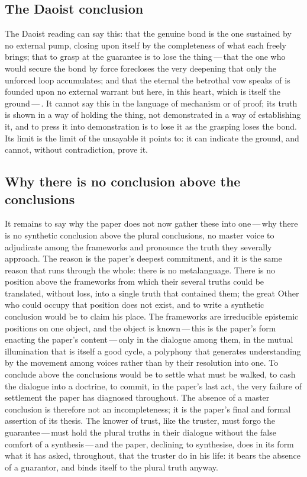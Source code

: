 \subsection*{The Daoist conclusion}
\label{p13:sub:concl-dao}

The Daoist reading can say this: that the genuine bond is the one sustained by no external pump, closing upon itself by the completeness of what each freely brings; that to grasp at the guarantee is to lose the thing\,---\,that the one who would secure the bond by force forecloses the very deepening that only the unforced loop accumulates; and that the eternal the betrothal vow speaks of is founded upon no external warrant but here, in this heart, which is itself the ground\,---\,. It cannot say this in the language of mechanism or of proof; its truth is shown in a way of holding the thing, not demonstrated in a way of establishing it, and to press it into demonstration is to lose it as the grasping loses the bond. Its limit is the limit of the unsayable it points to: it can indicate the ground, and cannot, without contradiction, prove it.

\subsection*{Why there is no conclusion above the conclusions}
\label{p13:sub:concl-meta}

It remains to say why the paper does not now gather these into one\,---\,why there is no synthetic conclusion above the plural conclusions, no master voice to adjudicate among the frameworks and pronounce the truth they severally approach. The reason is the paper's deepest commitment, and it is the same reason that runs through the whole: there is no metalanguage. There is no position above the frameworks from which their several truths could be translated, without loss, into a single truth that contained them; the great Other who could occupy that position does not exist, and to write a synthetic conclusion would be to claim his place. The frameworks are irreducible epistemic positions on one object, and the object is known\,---\,this is the paper's form enacting the paper's content\,---\,only in the dialogue among them, in the mutual illumination that is itself a good cycle, a polyphony that generates understanding by the movement among voices rather than by their resolution into one. To conclude above the conclusions would be to settle what must be walked, to cash the dialogue into a doctrine, to commit, in the paper's last act, the very failure of settlement the paper has diagnosed throughout. The absence of a master conclusion is therefore not an incompleteness; it is the paper's final and formal assertion of its thesis. The knower of trust, like the truster, must forgo the guarantee\,---\,must hold the plural truths in their dialogue without the false comfort of a synthesis\,---\,and the paper, declining to synthesise, does in its form what it has asked, throughout, that the truster do in his life: it bears the absence of a guarantor, and binds itself to the plural truth anyway.

